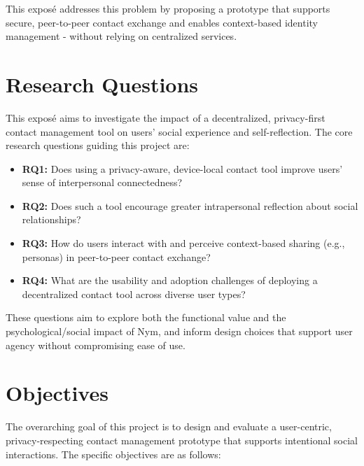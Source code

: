 \documentclass{imc-inf}
\begin{document}
This exposé addresses this problem by proposing a prototype that supports secure, peer-to-peer contact exchange and enables context-based identity management - without relying on centralized services.


\chapter{Research Questions}
This exposé aims to investigate the impact of a decentralized, privacy-first contact management tool on users' social experience and self-reflection. The core research questions guiding this project are:

\begin{itemize}
  \item \textbf{RQ1:} Does using a privacy-aware, device-local contact tool improve users’ sense of interpersonal connectedness?
  \item \textbf{RQ2:} Does such a tool encourage greater intrapersonal reflection about social relationships?
  \item \textbf{RQ3:} How do users interact with and perceive context-based sharing (e.g., personas) in peer-to-peer contact exchange?
  \item \textbf{RQ4:} What are the usability and adoption challenges of deploying a decentralized contact tool across diverse user types?
\end{itemize}

These questions aim to explore both the functional value and the psychological/social impact of Nym, and inform design choices that support user agency without compromising ease of use.



\chapter{Objectives}
The overarching goal of this project is to design and evaluate a user-centric, privacy-respecting contact management prototype that supports intentional social interactions. The specific objectives are as follows:
\end{document}
